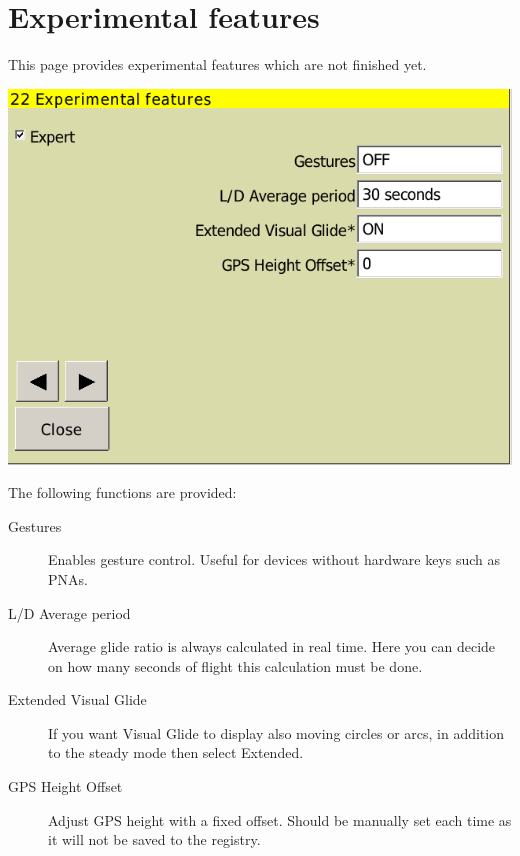 \documentclass[a4paper,12pt]{refrep}
\begin{document}




\clearpage
\section{Experimental features}


This page provides experimental features which are not finished yet.

\begin{center}
\includegraphics[angle=0,width=\linewidth,keepaspectratio='true']{figures/config-exp.png}
\end{center}

The following functions are provided:
\begin{description}
\item[Gestures] Enables gesture control. Useful for devices without hardware keys such as PNAs.
\item[L/D Average period] Average glide ratio is always calculated in real time. Here you can decide on how many seconds of flight this calculation must be done.
\item[Extended Visual Glide] If you want Visual Glide to display also moving circles or arcs, in addition to the steady mode then select Extended.
\item[GPS Height Offset] Adjust GPS height with a fixed offset. Should be manually set each time as it will not be saved to the registry.
\end{description}
\end{document}
